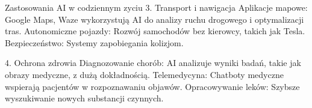 \begin{frame}{Zastosowania AI w codziennym zyciu}
3. Transport i nawigacja
Aplikacje mapowe: 
Google Maps, Waze wykorzystują AI do analizy ruchu drogowego i optymalizacji tras.
Autonomiczne pojazdy: 
Rozwój samochodów bez kierowcy, takich jak Tesla.
Bezpieczeństwo:
Systemy zapobiegania kolizjom.

4. Ochrona zdrowia
Diagnozowanie chorób: 
AI analizuje wyniki badań, takie jak obrazy medyczne, z dużą dokładnością.
Telemedycyna: 
Chatboty medyczne wspierają pacjentów w rozpoznawaniu objawów.
Opracowywanie leków: 
Szybsze wyszukiwanie nowych substancji czynnych.
\end{frame}


